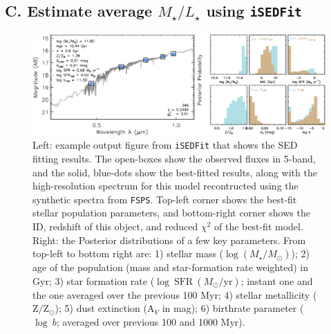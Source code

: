 \documentclass{emulateapj}
\def\logms{{$\log (M_{\star}/M_{\odot})$}}
\begin{document}
\begin{CJK*}{UTF8}{gbsn}

\section{C. Estimate average {$M_{\star}/L_{\star}$} using \texttt{iSEDFit}} 
    \label{app:B}

    \begin{figure}[bt!]
        \begin{center}
        \includegraphics[width=\textwidth]{fig/redbcg_isedfit_example.pdf}
        \caption{Left: example output figure from \texttt{iSEDFit} that shows the SED 
        	fitting results. 
            The open-boxes show the observed fluxes in 5-band, and the solid, blue-dots
            show the best-fitted results, along with the high-resolution spectrum for
            this model recontructed using the synthetic spectra from \texttt{FSPS}. 
            Top-left corner shows the best-fit stellar population parameters, and 
            bottom-right corner shows the ID, redshift of this object, and reduced 
            $\chi^2$ of the best-fit model.~~~
            Right: the Posterior distributions of a few key parameters.
            From top-left to bottom right are: 1) stellar mass (\logms{}); 2) age of the 
            population (mass and star-formation rate weighted) in Gyr; 3) star formation 
            rate ($\log\ \mathrm{SFR}\ (M_{\odot}/\mathrm{yr})$; instant one and the one 
            averaged over the previous 100 Myr; 4) stellar metallicity 
            ($\mathrm{Z}/\mathrm{Z}_{\odot}$); 5) dust extinction ($\mathrm{A}_V$ in mag);
            6) birthrate parameter ($\log\ b$; averaged over previous 100 and 1000 Myr).}
        \label{fig:ised}
        \end{center}
    \end{figure}


\end{CJK*}
\end{document}
